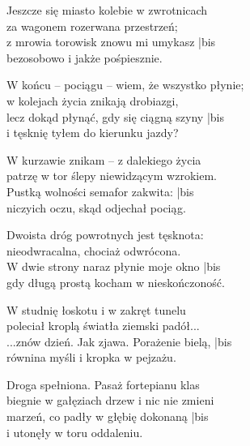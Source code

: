 \begin{text}
    \hfill\break
    Jeszcze się miasto kolebie w zwrotnicach\\
    za wagonem rozerwana przestrzeń;\\
    z mrowia torowisk znowu mi umykasz |bis\\
    bezosobowo i jakże pośpiesznie.

    W końcu – pociągu – wiem, że wszystko płynie;\\
    w kolejach życia znikają drobiazgi,\\
    lecz dokąd płynąć, gdy się ciągną szyny |bis\\
    i tęsknię tyłem do kierunku jazdy?

    W kurzawie znikam – z dalekiego życia\\
    patrzę w tor ślepy niewidzącym wzrokiem.\\
    Pustką wolności semafor zakwita: |bis\\
    niczyich oczu, skąd odjechał pociąg.

    Dwoista dróg powrotnych jest tęsknota:\\
    nieodwracalna, chociaż odwrócona.\\
    W dwie strony naraz płynie moje okno |bis\\
    gdy długą prostą kocham w nieskończoność.

    \hfill\break
    W studnię łoskotu i w zakręt tunelu\\
    poleciał kroplą światła ziemski padół...\\
    ...znów dzień. Jak zjawa. Porażenie bielą, |bis\\
    równina myśli i kropka w pejzażu.

    Droga spełniona. Pasaż fortepianu klas\\
    biegnie w gałęziach drzew i nic nie zmieni\\
    marzeń, co padły w głębię dokonaną |bis\\
    i utonęły w toru oddaleniu.
\end{text}
